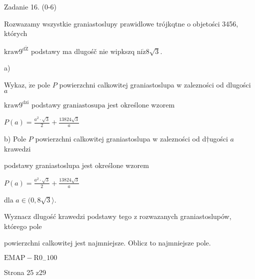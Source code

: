 \documentclass[a4paper,12pt]{article}
\begin{document}
Zadanie 16. (0-6)

Rozwazamy wszystkie graniastoslupy prawidlowe trójkqtne o objetości 3456, których

$\mathrm{k}\mathrm{r}\mathrm{a}\mathrm{w}9^{\mathrm{d}\acute{\mathrm{Z}}}$ podstawy ma dlugośč nie wipkszq $\mathrm{n}\mathrm{i}\dot{\mathrm{z}} 8\sqrt{3}.$

a)

Wykaz, $\dot{\mathrm{z}}\mathrm{e}$ pole $P$ powierzchni calkowitej graniastoslupa w zalezności od dlugości $a$

$\mathrm{k}\mathrm{r}\mathrm{a}\mathrm{w}9^{\mathrm{d}\mathrm{z}\mathrm{i}}$ podstawy $\mathrm{g}\mathrm{r}\mathrm{a}\mathrm{n}\mathrm{i}\mathrm{a}\mathrm{s}\mathrm{t}\mathrm{o}\mathrm{s}\mathrm{u}\mathrm{p}\mathrm{a}$ jest określone wzorem

$P(a)=\displaystyle \frac{a^{2}\cdot\sqrt{3}}{2}+\frac{13824\sqrt{3}}{a}$

b) Pole $P$ powierzchni calkowitej graniastoslupa w zalezności od d$\dagger$ugości $a$ krawedzi

podstawy graniastoslupa jest określone wzorem

$P(a)=\displaystyle \frac{a^{2}\cdot\sqrt{3}}{2}+\frac{13824\sqrt{3}}{a}$

dla $a\in(0,8\sqrt{3}\rangle.$

Wyznacz dlugość krawedzi podstawy tego z rozwazanych graniastoslupów, którego pole

powierzchni calkowitej jest najmniejsze. Oblicz to najmniejsze pole.

$\mathrm{E}\mathrm{M}\mathrm{A}\mathrm{P}-\mathrm{R}0_{-}100$

Strona 25 z29
\end{document}
